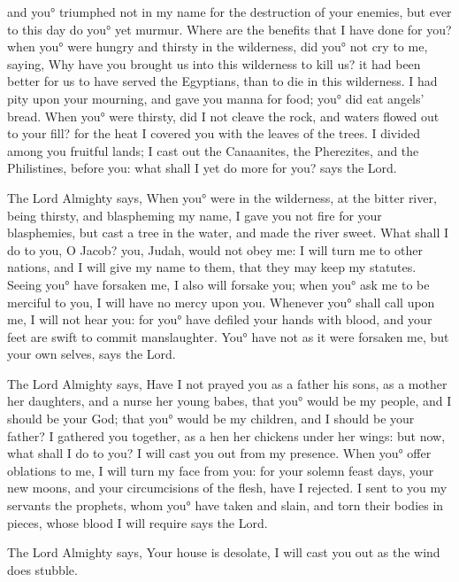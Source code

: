 {and you° triumphed not in my name for the destruction of your enemies, but ever to this day do you° yet murmur.
Where are the benefits that I have done for you? when you° were hungry and thirsty in the wilderness, did you° not cry to me,
saying, Why have you brought us into this wilderness to kill us? it had been better for us to have served the Egyptians, than to die in this wilderness.
I had pity upon your mourning, and gave you manna for food; you° did eat angels’ bread.
When you° were thirsty, did I not cleave the rock, and waters flowed out to your fill? for the heat I covered you with the leaves of the trees.
I divided among you fruitful lands; I cast out the Canaanites, the Pherezites, and the Philistines, before you: what shall I yet do more for you? says the Lord.
\par }{\PP {}The Lord Almighty says, When you° were in the wilderness, at the bitter river, being thirsty, and blaspheming my name,
I gave you not fire for your blasphemies, but cast a tree in the water, and made the river sweet.
What shall I do to you, O Jacob? you, Judah, would not obey me: I will turn me to other nations, and I will give my name to them, that they may keep my statutes.
Seeing you° have forsaken me, I also will forsake you; when you° ask me to be merciful to you, I will have no mercy upon you.
Whenever you° shall call upon me, I will not hear you: for you° have defiled your hands with blood, and your feet are swift to commit manslaughter.
You° have not as it were forsaken me, but your own selves, says the Lord.
\par }{\PP {}The Lord Almighty says, Have I not prayed you as a father his sons, as a mother her daughters, and a nurse her young babes,
that you° would be my people, and I should be your God; that you° would be my children, and I should be your father?
I gathered you together, as a hen
{} her chickens under her wings: but now, what shall I do to you? I will cast you out from my presence.
When you° offer oblations to me, I will turn my face from you: for your solemn feast days, your new moons, and your circumcisions of the flesh, have I rejected.
I sent to you my servants the prophets, whom you° have taken and slain, and torn their bodies in pieces, whose blood I will require
{} says the Lord.
\par }{\PP {}The Lord Almighty says, Your house is desolate, I will cast you out as the wind does stubble.
}
